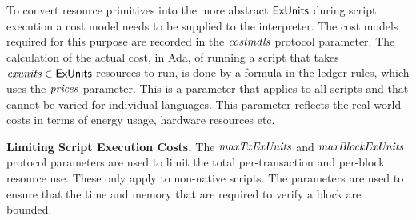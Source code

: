 To convert resource primitives into the
more abstract $\mathsf{ExUnits}$ during script execution a cost model needs to be supplied to the interpreter.
The cost models required for this purpose are recorded in the $\mathit{costmdls}$ protocol parameter.
%
The calculation of the actual cost, in Ada, of running
a script that takes $\mathit{exunits} \in \mathsf{ExUnits}$ resources to run,
is done by a formula in the ledger rules, which uses the
$\mathit{prices}$ parameter. This is a parameter that applies to all
scripts and that cannot be varied for individual languages. This parameter
reflects the real-world costs in terms of energy usage, hardware resources etc.

\textbf{Limiting Script Execution Costs.}
The $\mathit{maxTxExUnits}$ and $\mathit{maxBlockExUnits}$ protocol parameters are
used to limit the total per-transaction and per-block resource use. These only apply to non-native scripts.
The parameters are used to ensure that the time and memory that are required to verify a block are bounded.

